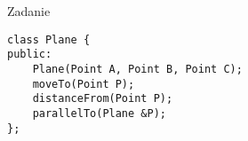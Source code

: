 \documentclass[pdftex, smaller]{beamer}
\begin{document}
\begin{frame}[fragile]{Zadanie}

\begin{lstlisting}
class Plane {
public:
	Plane(Point A, Point B, Point C);
	moveTo(Point P);
	distanceFrom(Point P);
	parallelTo(Plane &P);
};
\end{lstlisting}

\end{frame}
\end{document}
